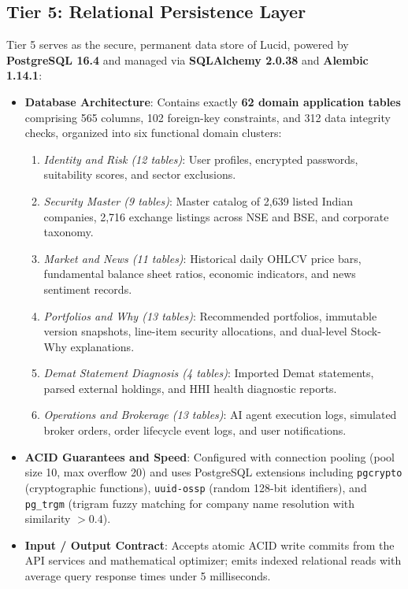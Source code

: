 \subsection{Tier 5: Relational Persistence Layer}
Tier 5 serves as the secure, permanent data store of Lucid, powered by \textbf{PostgreSQL 16.4} and managed via \textbf{SQLAlchemy 2.0.38} and \textbf{Alembic 1.14.1}:
\begin{itemize}
    \item \textbf{Database Architecture}: Contains exactly \textbf{62 domain application tables} comprising 565 columns, 102 foreign-key constraints, and 312 data integrity checks, organized into six functional domain clusters:
    \begin{enumerate}
        \item \textit{Identity and Risk (12 tables)}: User profiles, encrypted passwords, suitability scores, and sector exclusions.
        \item \textit{Security Master (9 tables)}: Master catalog of 2,639 listed Indian companies, 2,716 exchange listings across NSE and BSE, and corporate taxonomy.
        \item \textit{Market and News (11 tables)}: Historical daily OHLCV price bars, fundamental balance sheet ratios, economic indicators, and news sentiment records.
        \item \textit{Portfolios and Why (13 tables)}: Recommended portfolios, immutable version snapshots, line-item security allocations, and dual-level Stock-Why explanations.
        \item \textit{Demat Statement Diagnosis (4 tables)}: Imported Demat statements, parsed external holdings, and HHI health diagnostic reports.
        \item \textit{Operations and Brokerage (13 tables)}: AI agent execution logs, simulated broker orders, order lifecycle event logs, and user notifications.
    \end{enumerate}
    \item \textbf{ACID Guarantees and Speed}: Configured with connection pooling (pool size 10, max overflow 20) and uses PostgreSQL extensions including \texttt{pgcrypto} (cryptographic functions), \texttt{uuid-ossp} (random 128-bit identifiers), and \texttt{pg\_trgm} (trigram fuzzy matching for company name resolution with similarity $> 0.4$).
    \item \textbf{Input / Output Contract}: Accepts atomic ACID write commits from the API services and mathematical optimizer; emits indexed relational reads with average query response times under 5 milliseconds.
\end{itemize}

